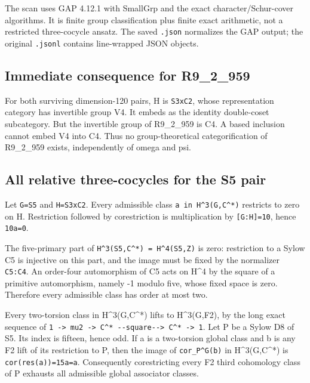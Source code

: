 The scan uses GAP 4.12.1 with SmallGrp and the exact
character/Schur-cover algorithms. It is finite group classification plus
finite exact arithmetic, not a restricted three-cocycle ansatz. The
saved \texttt{.\allowbreak{}json} normalizes the GAP output; the
original \texttt{.\allowbreak{}jsonl} contains line-wrapped JSON
objects.

\hypertarget{immediate-consequence-for-r9_2_959}{%
\subsection{Immediate consequence for
R9\_2\_959}\label{immediate-consequence-for-r9_2_959}}

For both surviving dimension-120 pairs, H is \texttt{S3xC2}, whose
representation category has invertible group V4. It embeds as the
identity double-coset subcategory. But the invertible group of
R9\_2\_959 is C4. A based inclusion cannot embed V4 into C4. Thus no
group-theoretical categorification of R9\_2\_959 exists, independently
of omega and psi.

\hypertarget{all-relative-three-cocycles-for-the-s5-pair}{%
\subsection{All relative three-cocycles for the S5
pair}\label{all-relative-three-cocycles-for-the-s5-pair}}

Let \texttt{G=S5} and \texttt{H=S3xC\allowbreak{}2}. Every admissible
class
\texttt{a in H\allowbreak{}\textasciicircum{}3(G,C\allowbreak{}\textasciicircum{}*)}
restricts to zero on H. Restriction followed by corestriction is
multiplication by \texttt{[G:H]=\allowbreak{}10}, hence \texttt{10a=0}.

The five-primary part of
\texttt{H\textasciicircum{}3(S5\allowbreak{},C\textasciicircum{}*) \allowbreak{}= H\textasciicircum{}4(\allowbreak{}S5,Z)}
is zero: restriction to a Sylow C5 is injective on this part, and the
image must be fixed by the normalizer \texttt{C5:C4}. An order-four
automorphism of C5 acts on H\^{}4 by the square of a primitive
automorphism, namely -1 modulo five, whose fixed space is zero.
Therefore every admissible class has order at most two.

Every two-torsion class in H\^{}3(G,C\^{}*) lifts to H\^{}3(G,F2), by
the long exact sequence of
\texttt{1 -\allowbreak{}> mu2 \allowbreak{}-\allowbreak{}> C\textasciicircum{}* \allowbreak{}-\allowbreak{}-\allowbreak{}square\allowbreak{}-\allowbreak{}-\allowbreak{}> C\textasciicircum{}* \allowbreak{}-\allowbreak{}> 1}.
Let P be a Sylow D8 of S5. Its index is fifteen, hence odd. If a is a
two-torsion global class and b is any F2 lift of its restriction to P,
then the image of
\texttt{cor\_\allowbreak{}P\textasciicircum{}G(b)\allowbreak{}} in
H\^{}3(G,C\^{}*) is
\texttt{cor(re\allowbreak{}s(a))=\allowbreak{}15a=a}. Consequently
corestricting every F2 third cohomology class of P exhausts all
admissible global associator classes.

